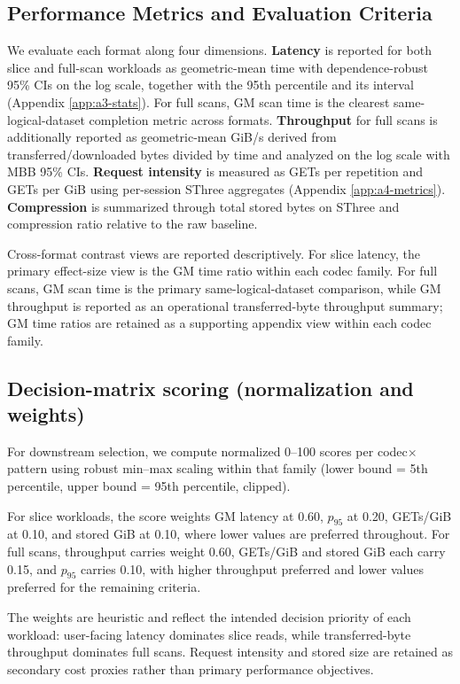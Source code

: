 \documentclass[nomenclature, english, bibtex]{kththesis}
\numberwithin{listing}{chapter}
\begin{document}
\subsection{Performance Metrics and Evaluation Criteria}
We evaluate each format along four dimensions. \textbf{Latency} is reported for both slice and full-scan workloads as geometric-mean time with dependence-robust 95\% \glspl{CI} on the log scale, together with the 95th percentile and its interval (Appendix \ref{app:a3-stats}). For full scans, \gls{GM} scan time is the clearest same-logical-dataset completion metric across formats. \textbf{Throughput} for full scans is additionally reported as geometric-mean GiB/s derived from transferred/downloaded bytes divided by time and analyzed on the log scale with \gls{MBB} 95\% \glspl{CI}. \textbf{Request intensity} is measured as GETs per repetition and GETs per GiB using per-session \gls{SThree} aggregates (Appendix \ref{app:a4-metrics}). \textbf{Compression} is summarized through total stored bytes on \gls{SThree} and compression ratio relative to the raw baseline.

Cross-format contrast views are reported descriptively. For slice latency, the primary effect-size view is the \gls{GM} time ratio within each codec family. For full scans, \gls{GM} scan time is the primary same-logical-dataset comparison, while \gls{GM} throughput is reported as an operational transferred-byte throughput summary; \gls{GM} time ratios are retained as a supporting appendix view within each codec family.

\subsection{Decision-matrix scoring (normalization and weights)}
For downstream selection, we compute normalized 0–100 scores per codec\(\times\)pattern using robust min–max scaling within that family (lower bound = 5th percentile, upper bound = 95th percentile, clipped).

For slice workloads, the score weights \gls{GM} latency at 0.60, \(p_{95}\) at 0.20, GETs/GiB at 0.10, and stored GiB at 0.10, where lower values are preferred throughout. For full scans, throughput carries weight 0.60, GETs/GiB and stored GiB each carry 0.15, and \(p_{95}\) carries 0.10, with higher throughput preferred and lower values preferred for the remaining criteria.

The weights are heuristic and reflect the intended decision priority of each workload: user-facing latency dominates slice reads, while transferred-byte throughput dominates full scans. Request intensity and stored size are retained as secondary cost proxies rather than primary performance objectives.
\end{document}
